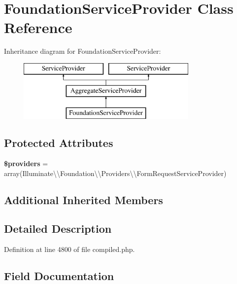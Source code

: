 \section{Foundation\+Service\+Provider Class Reference}
\label{class_illuminate_1_1_foundation_1_1_bus_1_1_foundation_service_provider}
Inheritance diagram for Foundation\+Service\+Provider\+:\begin{figure}[H]
\begin{center}
\leavevmode
\includegraphics[height=3.000000cm]{class_illuminate_1_1_foundation_1_1_bus_1_1_foundation_service_provider}
\end{center}
\end{figure}
\subsection*{Protected Attributes}
\begin{DoxyCompactItemize}
\item 
{\bf \$providers} = array(\textquotesingle{}Illuminate\textbackslash{}\textbackslash{}\+Foundation\textbackslash{}\textbackslash{}\+Providers\textbackslash{}\textbackslash{}\+Form\+Request\+Service\+Provider\textquotesingle{})
\end{DoxyCompactItemize}
\subsection*{Additional Inherited Members}


\subsection{Detailed Description}


Definition at line 4800 of file compiled.\+php.



\subsection{Field Documentation}
